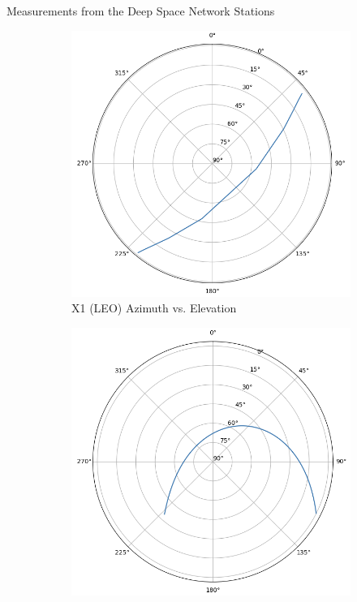 \begin{hwkProblem}{4}{Measurements from the Deep Space Network Stations}
	\begin{figure}[H] \label{fig:s04a}
		\begin{center}
			\begin{subfigure}{0.4\textwidth} \label{fig:s04a1}
				\includegraphics[width=\linewidth]{./images/s04a1.png}
				\caption{X1 (LEO) Azimuth vs. Elevation}
			\end{subfigure}
			\begin{subfigure}{0.4\textwidth} \label{fig:s04a2}
				\includegraphics[width=\linewidth]{./images/s04a2.png}

\end{subfigure}
\end{center}
\end{figure}
\end{hwkProblem}
